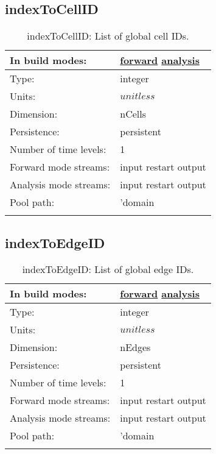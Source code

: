 \subsection[indexToCellID]{indexToCellID}
\label{subsec:var_sec_mesh_indexToCellID}
\begin{center}
\begin{longtable}{| p{2.0in} | p{4.0in} |}
        \hline 
        In build modes: & \hyperref[subsec:forward_var_tab_mesh]{forward} \hyperref[subsec:analysis_var_tab_mesh]{analysis} \\
        \hline 
        Type: & integer \\
        \hline 
        Units: & $unitless$ \\
        \hline 
        Dimension: & nCells \\
        \hline 
        Persistence: & persistent \\
        \hline 
        Number of time levels: & 1 \\
        \hline 
		 Forward mode streams: &  input restart output \\
        \hline 
		 Analysis mode streams: &  input restart output \\
        \hline 
            Pool path: & 'domain %
 \\
		 \hline 
    \caption{indexToCellID: List of global cell IDs.}
\end{longtable}
\end{center}
\subsection[indexToEdgeID]{indexToEdgeID}
\label{subsec:var_sec_mesh_indexToEdgeID}
\begin{center}
\begin{longtable}{| p{2.0in} | p{4.0in} |}
        \hline 
        In build modes: & \hyperref[subsec:forward_var_tab_mesh]{forward} \hyperref[subsec:analysis_var_tab_mesh]{analysis} \\
        \hline 
        Type: & integer \\
        \hline 
        Units: & $unitless$ \\
        \hline 
        Dimension: & nEdges \\
        \hline 
        Persistence: & persistent \\
        \hline 
        Number of time levels: & 1 \\
        \hline 
		 Forward mode streams: &  input restart output \\
        \hline 
		 Analysis mode streams: &  input restart output \\
        \hline 
            Pool path: & 'domain %
 \\
		 \hline 
    \caption{indexToEdgeID: List of global edge IDs.}
\end{longtable}
\end{center}
